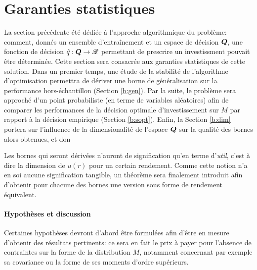 \section{Garanties statistiques}


La section précédente été dédiée à l'approche algorithmique du problème: comment, donnés
un ensemble d'entraînement et un espace de décision $\bm Q$, une fonction de décision
$\hat q:\bm Q \to \mathscr{R}$ permettant de prescrire un investissment pouvait être déterminée. Cette
section sera consacrée aux garanties statistiques de cette solution. Dans un premier
temps, une étude de la stabilité de l'algorithme d'optimisation permettra de dériver une
borne de généralisation sur la performance hors-échantillon (Section \ref{b:gen}). Par la
suite, le problème sera approché d'un point probabiliste (en terme de variables
aléatoires) afin de comparer les performances de la décision optimale d'investissement sur
$M$ par rapport à la décision empirique (Section \ref{b:sopt}). Enfin, la Section
\ref{b:dim} portera sur l'influence de la dimensionalité de l'espace $\bm Q$ sur la qualité
des bornes alors obtenues, et don

Les bornes qui seront dérivées n'auront de signification qu'en terme d'\textit{util},
c'est à dire la dimension de $u(r)$ pour un certain rendement. Comme cette notion n'a en
soi aucune signification tangible, un théorème sera finalement introduit afin d'obtenir
pour chacune des bornes une version sous forme de rendement équivalent.


\paragraph{Hypothèses et discussion}

Certaines hypothèses devront d'abord être formulées afin d'être en mesure d'obtenir des
résultats pertinents: ce sera en fait le prix à payer pour l'absence de contraintes sur la
forme de la distribution $M$, notamment concernant par exemple sa covariance ou la forme
de ses moments d'ordre supérieurs.

